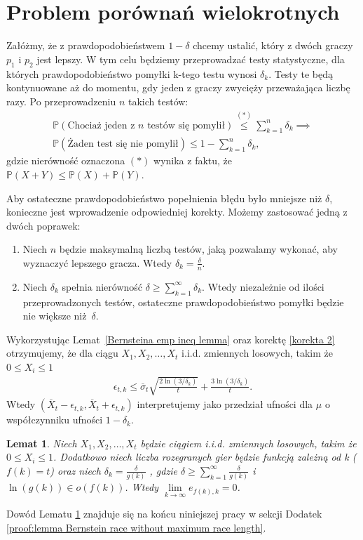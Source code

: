 \documentclass[inzynierska]{pwr_wmat_praca_dyplomowa}
\theoremstyle{plain}
\numberwithin{theorem}{chapter}
\newtheorem{lemma}[theorem]{Lemat}
\theoremstyle{definition}
\numberwithin{theorem}{chapter}
\newcommand{\probP}{\mathbb{P}}
\begin{document}
	\section{Problem porównań wielokrotnych}
	Załóżmy, że z prawdopodobieństwem $1-\delta$ chcemy ustalić, który z dwóch graczy $p_1$ i $p_2$ jest lepszy. W tym celu będziemy przeprowadzać testy statystyczne, dla których	prawdopodobieństwo pomyłki k-tego testu wynosi $\delta_k$. Testy te będą kontynuowane aż do momentu, gdy jeden z graczy zwycięży przeważająca liczbę razy. Po przeprowadzeniu $n$ takich testów:
	\begin{gather*}
		\probP(\text{Chociaż jeden z $n$ testów się pomylił}) \overset{(*)}{\le} \sum_{k=1}^n \delta_k \implies  \\
	\probP(\text{Żaden test się nie pomylił}) \le 1 - \sum_{k=1}^n \delta_k,
	\end{gather*} 
	gdzie nierówność oznaczona $(*)$ wynika z faktu, że $\probP(X+Y) \le \probP(X) + \probP(Y)$.
	
	Aby ostateczne prawdopodobieństwo popełnienia błędu było mniejsze niż $\delta$, konieczne jest wprowadzenie odpowiedniej korekty.
	Możemy zastosować jedną z dwóch poprawek:
	\begin{enumerate}[label=\thesection.\arabic*]
		\item \label{korekta 1} Niech $n$ będzie maksymalną liczbą testów, jaką pozwalamy wykonać, aby wyznaczyć lepszego
		gracza. Wtedy $\delta_k=\frac{\delta}{n}$.
		\item \label{korekta 2} Niech $\delta_k$ spełnia nierówność $ \delta \ge \sum_{k = 1}^{\infty}\delta_k$. Wtedy niezależnie od
		ilości przeprowadzonych testów, ostateczne
		prawdopodobieństwo pomyłki będzie nie większe niż~$\delta$.
	\end{enumerate}
	Wykorzystując Lemat~\ref{Bernsteina emp ineq lemma} oraz korektę \ref{korekta 2} otrzymujemy, że dla ciągu $X_1, X_2, \dots, X_t$ i.i.d. zmiennych losowych, takim że  $0 \le X_i \le 1$ 
	\begin{align}
		\label{Bernstein race without maximum race length}
		\epsilon_{t, k} \le \overline{\sigma}_t \sqrt{\frac{2\ln(3/\delta_k)}{t}} + \frac{3  \ln{(3 / \delta_k)}}{t}.
	\end{align}
	Wtedy $(\overline{X}_t - \epsilon_{t,k}, \overline{X}_t + \epsilon_{t,k})$ interpretujemy jako przedział ufności dla $\mu$ o współczynniku ufności $1-\delta_k$.
	\begin{lemma}
		\label{lemma Bernstein race without maximum race length}
		Niech $X_1, X_2, \dots, X_t$ będzie ciągiem i.i.d. zmiennych losowych, takim że  $0 \le X_i \le 1$. Dodatkowo niech liczba rozegranych gier będzie funkcją zależną od k ($f(k) = t$) oraz niech $\delta_k = \frac{\delta}{g(k)}$
		, gdzie $\delta \ge \sum_{k=1}^{\infty} \frac{\delta}{g(k)}$ i $\ln(g(k)) \in o(f(k))$. Wtedy
		$\lim\limits_{k\to\infty} e_{f(k), k} = 0$. 
	\end{lemma}
	Dowód Lematu \ref{lemma Bernstein race without maximum race length} znajduje się na końcu niniejszej pracy w sekcji Dodatek	\ref{proof:lemma Bernstein race without maximum race length}.
	
\end{document}
